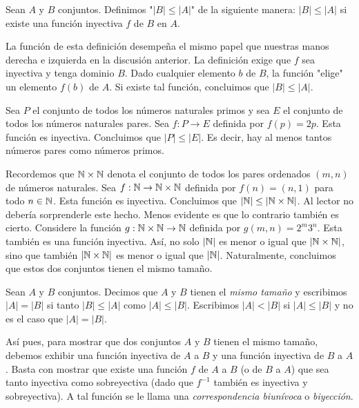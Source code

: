 \message{ !name(main.tex)}\documentclass[12pt,a4paper]{book}
\newcommand{\comillas}[1]{"#1"}
\begin{document}
    \begin{definicion}\label{def:menor-igual-tamano}
        Sean $A$ y $B$ conjuntos. Definimos \comillas{$|B|\leq|A|$} de la siguiente manera: $|B|\leq|A|$ si existe una
        función inyectiva $f$ de $B$ en $A$.
    \end{definicion}

    La función de esta definición desempeña el mismo papel que nuestras manos derecha e izquierda en la discusión anterior.
    La definición exige que $f$ sea inyectiva y tenga dominio $B$. Dado cualquier elemento $b$ de $B$, la función
    \comillas{elige} un elemento $f(b)$ de $A$. Si existe tal función, concluimos que $|B|\leq|A|$.

    \begin{ejemplo}
        Sea $P$ el conjunto de todos los números naturales primos y sea $E$ el conjunto de todos los números naturales
        pares. Sea $f:P\rightarrow E$ definida por $f(p)=2p$. Esta función es inyectiva. Concluimos que $|P|\leq|E|$. Es
        decir, hay al menos tantos números pares como números primos.
    \end{ejemplo}

    \begin{ejemplo}\label{ej:NxN-mismo-tamano}
        Recordemos que $\mathbb{N}\times\mathbb{N}$ denota el conjunto de todos los pares ordenados $(m,n)$ de números naturales. Sea
        $f:\mathbb{N}\rightarrow\mathbb{N}\times\mathbb{N}$ definida por $f(n)=(n,1)$ para todo $n\in\mathbb{N}$. Esta función es inyectiva. Concluimos que
        $|\mathbb{N}|\leq|\mathbb{N}\times\mathbb{N}|$. Al lector no debería sorprenderle este hecho. Menos evidente es que lo contrario también es
        cierto. Considere la función $g:\mathbb{N}\times\mathbb{N}\rightarrow\mathbb{N}$ definida por $g(m,n)=2^{m}3^{n}$. Esta también es una
        función inyectiva. Así, no solo $|\mathbb{N}|$ es menor o igual que $|\mathbb{N}\times\mathbb{N}|$, sino que también $|\mathbb{N}\times\mathbb{N}|$ es menor
        o igual que $|\mathbb{N}|$. Naturalmente, concluimos que estos dos conjuntos tienen el mismo tamaño.
    \end{ejemplo}

    \begin{definicion}\label{def:mismo-tamano}
        Sean $A$ y $B$ conjuntos. Decimos que $A$ y $B$ tienen el \textit{mismo tamaño} y escribimos $|A|=|B|$ si tanto
        $|B|\leq|A|$ como $|A|\leq|B|$. Escribimos $|A|<|B|$ si $|A|\leq|B|$ y no es el caso que $|A|=|B|$.
    \end{definicion}

    Así pues, para mostrar que dos conjuntos $A$ y $B$ tienen el mismo tamaño, debemos exhibir una función inyectiva de
    $A$ a $B$ y una función inyectiva de $B$ a $A$. Basta con mostrar que existe una función $f$ de $A$ a $B$ (o de $B$ a
    $A$) que sea tanto inyectiva como sobreyectiva (dado que $f^{-1}$ también es inyectiva y sobreyectiva). A tal función
    se le llama una \textit{correspondencia biunívoca} o \textit{biyección}.
\end{document}
